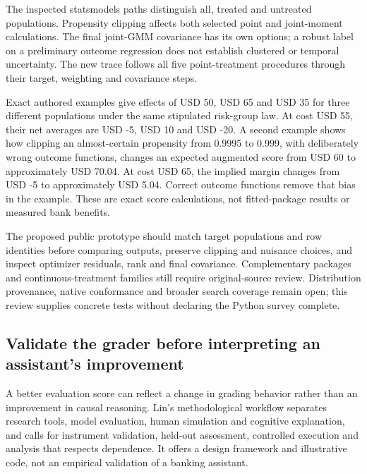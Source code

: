 The inspected statsmodels paths distinguish all, treated and untreated
populations. Propensity clipping affects both selected point and
joint-moment calculations. The final joint-GMM covariance has its own
options; a robust label on a preliminary outcome regression does not
establish clustered or temporal uncertainty. The new trace follows all
five point-treatment procedures through their target, weighting and
covariance steps. \citep{exec20_python_effect_source}

Exact authored examples give effects of USD 50, USD 65 and USD 35 for
three different populations under the same stipulated risk-group law. At
cost USD 55, their net averages are USD -5, USD 10 and USD -20. A second
example shows how clipping an almost-certain propensity from 0.9995 to
0.999, with deliberately wrong outcome functions, changes an expected
augmented score from USD 60 to approximately USD 70.04. At cost USD 65,
the implied margin changes from USD -5 to approximately USD 5.04.
Correct outcome functions remove that bias in the example. These are
exact score calculations, not fitted-package results or measured bank
benefits. \citep{exec20_python_effect_reference}

The proposed public prototype should match target populations and row
identities before comparing outputs, preserve clipping and nuisance
choices, and inspect optimizer residuals, rank and final covariance.
Complementary packages and continuous-treatment families still require
original-source review. Distribution provenance, native conformance and
broader search coverage remain open; this review supplies concrete tests
without declaring the Python survey complete.

\hypertarget{validate-the-grader-before-interpreting-an-assistants-improvement}{%
\subsection{Validate the grader before interpreting an assistant's
improvement}\label{validate-the-grader-before-interpreting-an-assistants-improvement}}

A better evaluation score can reflect a change in grading behavior
rather than an improvement in causal reasoning. Lin's methodological
workflow separates research tools, model evaluation, human simulation
and cognitive explanation, and calls for instrument validation, held-out
assessment, controlled execution and analysis that respects dependence.
It offers a design framework and illustrative code, not an empirical
validation of a banking assistant. \citep{exec20_validity}

